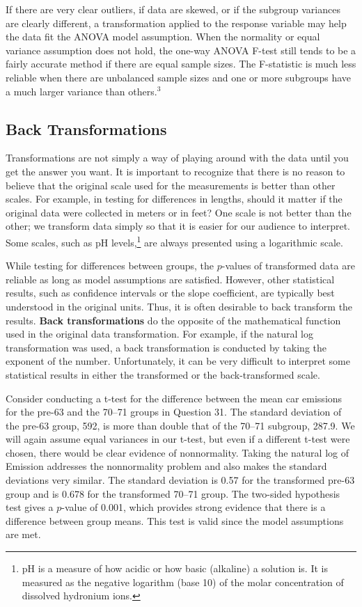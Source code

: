 \documentclass[
]{report}
\begin{document}
If there are very clear outliers, if data are skewed, or if the subgroup variances are clearly different, a transformation applied to the response variable may help the data fit the ANOVA model assumption. When the normality or equal variance assumption does not hold, the one-way ANOVA F-test still tends to be a fairly accurate method if there are equal sample sizes. The F-statistic is much less reliable when there are unbalanced sample sizes and one or more subgroups have a much larger variance than others.\(^3\)

\hypertarget{back-transformations}{%
\subsection*{Back Transformations}\label{back-transformations}}

Transformations are not simply a way of playing around with the data until you get the answer you want. It is important to recognize that there is no reason to believe that the original scale used for the measurements is better than other scales. For example, in testing for differences in lengths, should it matter if the original data were collected in meters or in feet? One scale is not better than the other; we transform data simply so that it is easier for our audience to interpret. Some scales, such as pH levels,\footnote{pH is a measure of how acidic or how basic (alkaline) a solution is. It is measured as the negative logarithm (base 10) of the molar concentration of dissolved hydronium ions.} are always presented using a logarithmic scale.

While testing for differences between groups, the \(\scriptstyle p\)-values of transformed data are reliable as long as model assumptions are satisfied. However, other statistical results, such as confidence intervals or the slope coefficient, are typically best understood in the original units. Thus, it is often desirable to back transform the results. \textbf{Back transformations} do the opposite of the mathematical function used in the original data transformation. For example, if the natural log transformation was used, a back transformation is conducted by taking the exponent of the number. Unfortunately, it can be very difficult to interpret some statistical results in either the transformed or the back-transformed scale.

Consider conducting a t-test for the difference between the mean car emissions for the pre-63 and the 70--71 groups in Question 31. The standard deviation of the pre-63 group, 592, is more than double that of the 70--71 subgroup, 287.9. We will again assume equal variances in our t-test, but even if a different t-test were chosen, there would be clear evidence of nonnormality. Taking the natural log of Emission addresses the nonnormality problem and also makes the standard deviations very similar. The standard deviation is 0.57 for the transformed pre-63 group and is 0.678 for the transformed 70--71 group. The two-sided hypothesis test gives a \(\scriptstyle p\)-value of 0.001, which provides strong evidence that there is a difference between group means. This test is valid since the model assumptions are met.
\end{document}
